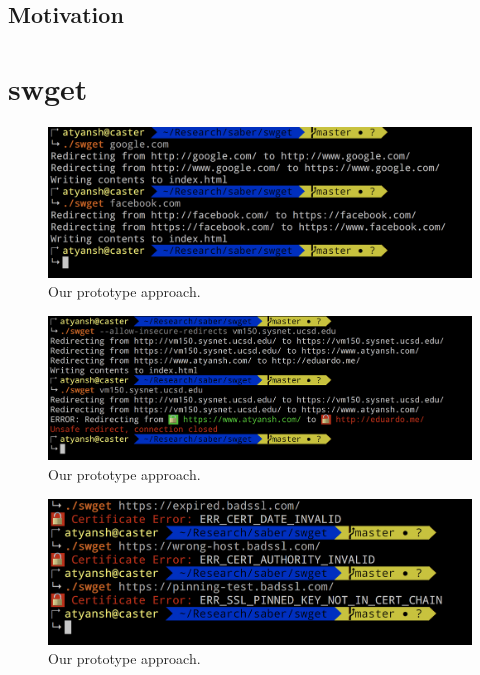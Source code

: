 \subsection{Motivation}

\section{swget}
\label{sec:swget-saber}


\begin{figure}[h]
  \includegraphics[width=\textwidth]{figures/regular}
  \caption[Prototype saber approach]{Our prototype approach.} 
  \label{fig:regular-saber}
\end{figure}

\begin{figure}[h]
  \includegraphics[width=\textwidth]{figures/redirect}
  \caption[Prototype saber approach]{Our prototype approach.} 
  \label{fig:redirect-saber}
\end{figure}

\begin{figure}[h]
  \includegraphics[width=\textwidth]{figures/cert-error}
  \caption[Prototype saber approach]{Our prototype approach.} 
  \label{fig:cert-error-saber}
\end{figure}

